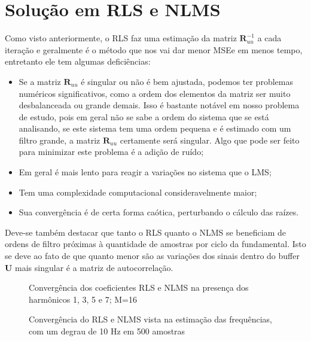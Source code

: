 \section{Solução em RLS e NLMS}

Como visto anteriormente, o RLS faz uma estimação da matriz $\boldsymbol{R}_{uu}^{-1}$ a cada iteração e geralmente é o método que nos vai dar menor MSEe em menos tempo, entretanto ele tem algumas deficiências:

\begin{itemize}
	\item Se a matriz $\boldsymbol{R}_{uu}$ é singular ou não é bem ajustada, podemos ter problemas numéricos significativos, como a ordem dos elementos da matriz ser muito desbalanceada ou grande demais. Isso é bastante notável em nosso problema de estudo, pois em geral não se sabe a ordem do sistema que se está analisando, se este sistema tem uma ordem pequena e é estimado com um filtro grande, a matriz $\boldsymbol{R}_{uu}$ certamente será singular. Algo que pode ser feito para minimizar este problema é a adição de ruído;
	\item Em geral é mais lento para reagir a variações no sistema que o LMS;
	\item Tem uma complexidade computacional consideravelmente maior;
	\item Sua convergência é de certa forma caótica, perturbando o cálculo das raízes.
\end{itemize}

Deve-se também destacar que tanto o RLS quanto o NLMS se beneficiam de ordens de filtro próximas à quantidade de amostras por ciclo da fundamental. Isto se deve ao fato de que quanto menor são as variações dos sinais dentro do buffer $\boldsymbol{U}$ mais singular é a matriz de autocorrelação. 

\begin{figure}[h]
	\centering    
	\def\svgwidth{\columnwidth}
	
	\caption{Convergência dos coeficientes RLS e NLMS na presença dos harmônicos 1, 3, 5 e 7; M=16}
	\label{fig:your image label}
\end{figure}

\begin{figure}[h]
	\centering    
	\def\svgwidth{\columnwidth}
	
	\caption{Convergência do RLS e NLMS vista na estimação das frequências, com um degrau de 10 Hz em 500 amostras}
	\label{fig:your image label}
\end{figure}


